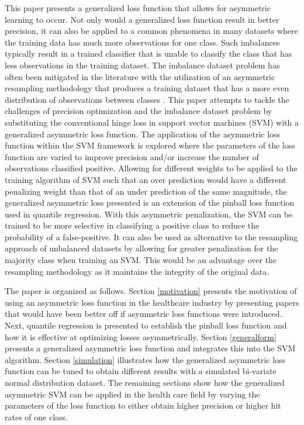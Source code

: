 This paper presents a generalized loss function that allows for asymmetric learning to occur. Not only would a generalized loss function result in better precision, it can also be applied to a common phenomena in many datasets where the training data has much more observations for one class. Such imbalances typically result in a trained classifier that is unable to classify the class that has less observations in the training dataset. The imbalance dataset problem has often been mitigated in the literature with the utilization of an asymmetric resampling methodology that produces a training dataset that has a more even distribution of observations between classes \citep{Hamed04}. This paper attempts to tackle the challenges of precision optimization and the imbalance dataset problem by substituting the conventional hinge loss in support vector machines (SVM) with a generalized asymmetric loss function. The application of the asymmetric loss function within the SVM framework is explored where the parameters of the loss function are varied to improve precision and/or increase the number of observations classified positive. Allowing for different weights to be applied to the training algorithm of SVM such that an over prediction would have a different penalizing weight than that of an under prediction of the same magnitude, the generalized asymmetric loss presented is an extension of the pinball loss function \citep{Steinwart07} used in quantile regression. With this asymmetric penalization, the SVM can be trained to be more selective in classifying a positive class to reduce the probability of a false-positive. It can also be used as alternative to the resampling approach of unbalanced datasets by allowing for greater penalization for the majority class when training an SVM. This would be an advantage over the resampling methodology as it maintains the integrity of the original data.

The paper is organized as follows. Section \ref{motivation} presents the motivation of using an asymmetric loss function in the healthcare industry by presenting papers that would have been better off if asymmetric loss functions were introduced. Next, quantile regression is presented to establish the pinball loss function and how it is effective at optimizing losses asymmetrically. Section \ref{generalform} presents a generalized asymmetric loss function and integrates this into the SVM algorithm. Section \ref{simulation} illustrates how the generalized asymmetric loss function can be tuned to obtain different results with a simulated bi-variate normal distribution dataset. The remaining sections show how the generalized asymmetric SVM can be applied in the health care field by varying the parameters of the loss function to either obtain higher precision or higher hit rates of one class.

